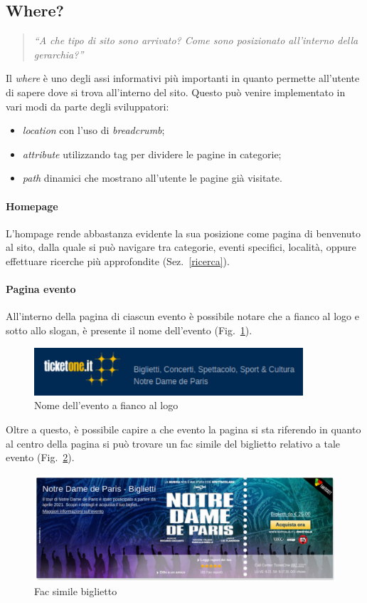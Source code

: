 \subsection{Where?}
	\begin{quote}
		\emph{``A che tipo di sito sono arrivato? Come sono posizionato all'interno della gerarchia?''}
	\end{quote}
	Il \textit{where} è uno degli assi informativi più importanti in quanto permette all'utente di sapere dove si trova all'interno del sito.
	Questo può venire implementato in vari modi da parte degli sviluppatori:
	\begin{itemize}[noitemsep]
		\item \textit{location} con l'uso di \textit{breadcrumb};
		\item \textit{attribute} utilizzando tag per dividere le pagine in categorie;
		\item \textit{path} dinamici che mostrano all'utente le pagine già visitate.
	\end{itemize}
	
	\paragraph{Homepage}
		L'hompage rende abbastanza evidente la sua posizione come pagina di benvenuto al sito, dalla quale si può navigare tra categorie, eventi specifici, località, oppure effettuare ricerche più approfondite (Sez.~\ref{ricerca}).

	\paragraph{Pagina evento}
		All'interno della pagina di ciascun evento è possibile notare che a fianco al logo e sotto allo slogan, è presente il nome dell'evento (Fig.~\ref{where}).
		\begin{figure}[hbt]
			\centering
			\includegraphics[width=10cm]{img/where.png}
			\caption{Nome dell'evento a fianco al logo}
			\label{where}
		\end{figure}
		Oltre a questo, è possibile capire a che evento la pagina si sta riferendo in quanto al centro della pagina si può trovare un fac simile del biglietto relativo a tale evento (Fig.~\ref{where2}).
		\begin{figure}[hbt]
			\centering
			\includegraphics[width=\textwidth]{img/where2.png}
			\caption{Fac simile biglietto}
			\label{where2}
		\end{figure}
	
